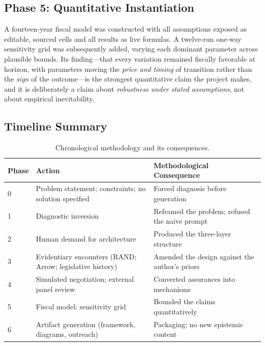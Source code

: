\documentclass[11pt,a4paper]{article}
\begin{document}
\subsection{Phase 5: Quantitative Instantiation}

A fourteen-year fiscal model was constructed with all assumptions exposed as editable, sourced cells and all results as live formulas. A twelve-run one-way sensitivity grid was subsequently added, varying each dominant parameter across plausible bounds. Its finding---that every variation remained fiscally favorable at horizon, with parameters moving the \emph{price and timing} of transition rather than the \emph{sign} of the outcome---is the strongest quantitative claim the project makes, and it is deliberately a claim about \emph{robustness under stated assumptions}, not about empirical inevitability.

\subsection{Timeline Summary}

\begin{table}[h!]
\centering
\small
\begin{tabular}{@{}p{2.1cm}p{5.4cm}p{6.4cm}@{}}
\toprule
\textbf{Phase} & \textbf{Action} & \textbf{Methodological Consequence} \\
\midrule
0 & Problem statement; constraints; no solution specified & Forced diagnosis before generation \\
1 & Diagnostic inversion & Reframed the problem; refused the naive prompt \\
2 & Human demand for architecture & Produced the three-layer structure \\
3 & Evidentiary encounters (RAND; Arrow; legislative history) & Amended the design against the author's priors \\
4 & Simulated negotiation; external panel review & Converted assurances into mechanisms \\
5 & Fiscal model; sensitivity grid & Bounded the claims quantitatively \\
6 & Artifact generation (framework, diagrams, outreach) & Packaging; no new epistemic content \\
\bottomrule
\end{tabular}
\caption{Chronological methodology and its consequences.}
\label{tab:timeline}
\end{table}

\end{document}
